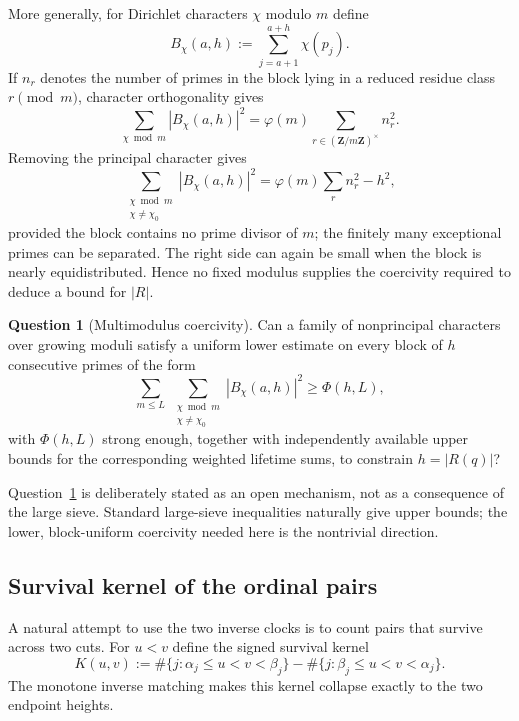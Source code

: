 \documentclass[11pt]{amsart}
\numberwithin{equation}{section}
\theoremstyle{plain}
\theoremstyle{definition}
\newtheorem{question}[theorem]{Question}
\theoremstyle{remark}
\begin{document}
More generally, for Dirichlet characters $\chi$ modulo $m$ define
\begin{equation}
\label{eq:Bchi-definition}
B_\chi(a,h):=\sum_{j=a+1}^{a+h}\chi(p_j).
\end{equation}
If $n_r$ denotes the number of primes in the block lying in a reduced residue
class $r\pmod m$, character orthogonality gives
\begin{equation}
\label{eq:character-block-energy}
\sum_{\chi\bmod m}|B_\chi(a,h)|^2
=\varphi(m)\sum_{r\in(\mathbf Z/m\mathbf Z)^\times}n_r^2.
\end{equation}
Removing the principal character gives
\begin{equation}
\label{eq:nonprincipal-character-energy}
\sum_{\substack{\chi\bmod m\\\chi\ne\chi_0}}|B_\chi(a,h)|^2
=\varphi(m)\sum_r n_r^2-h^2,
\end{equation}
provided the block contains no prime divisor of $m$; the finitely many
exceptional primes can be separated.  The right side can again be small when
the block is nearly equidistributed.  Hence no fixed modulus supplies the
coercivity required to deduce a bound for $|R|$.

\begin{question}[Multimodulus coercivity]
\label{q:multimodulus-coercivity}
Can a family of nonprincipal characters over growing moduli satisfy a uniform
lower estimate on every block of $h$ consecutive primes of the form
\begin{equation}
\label{eq:multimodulus-coercivity-target}
\sum_{m\le L}\ \sum_{\substack{\chi\bmod m\\\chi\ne\chi_0}}
|B_\chi(a,h)|^2
\ge \Phi(h,L),
\end{equation}
with $\Phi(h,L)$ strong enough, together with independently available upper
bounds for the corresponding weighted lifetime sums, to constrain
$h=|R(q)|$?
\end{question}

Question~\ref{q:multimodulus-coercivity} is deliberately stated as an open
mechanism, not as a consequence of the large sieve.  Standard large-sieve
inequalities naturally give upper bounds; the lower, block-uniform coercivity
needed here is the nontrivial direction.

\subsection{Survival kernel of the ordinal pairs}
\label{subsec:survival-kernel}
A natural attempt to use the two inverse clocks is to count pairs that survive
across two cuts.  For $u<v$ define the signed survival kernel
\begin{equation}
\label{eq:survival-kernel-definition}
K(u,v):=
\#\{j:\alpha_j\le u<v<\beta_j\}
-\#\{j:\beta_j\le u<v<\alpha_j\}.
\end{equation}
The monotone inverse matching makes this kernel collapse exactly to the two
endpoint heights.
\end{document}
